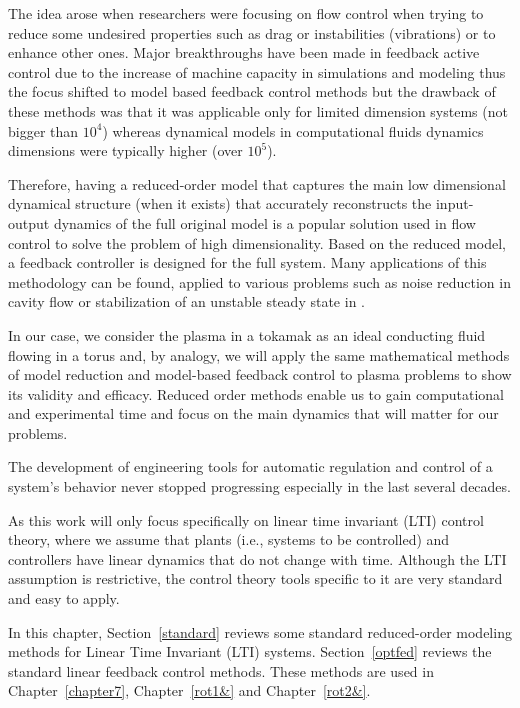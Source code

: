 \documentclass[12pt,lot, lof]{puthesis}
\begin{document}
The idea arose when researchers were focusing on flow control when trying to reduce some undesired properties such as drag or instabilities (vibrations) or to enhance other ones. Major breakthroughs have been made in feedback active control due to the increase of machine capacity in simulations and modeling \cite{ Kim07, Cattafesta08, Choi07, Sipp10} thus the focus shifted to model based feedback control methods but the drawback of these methods was that it was applicable only for limited dimension systems (not bigger than $10^4$) whereas dynamical models in computational fluids dynamics dimensions were typically higher (over $10^5$). 

Therefore, having a reduced-order model that captures the main low dimensional dynamical structure (when it exists) that accurately reconstructs the input-output dynamics of the full original model is a popular solution used in flow control to solve the problem of high dimensionality. Based on the reduced model, a feedback controller is designed for the full system. Many applications of this methodology can be found, applied to various problems such as noise reduction in cavity flow \cite{Rowley05} or stabilization of an unstable steady state in \cite{Ahuja10}.

In our case, we consider the plasma in a tokamak as an ideal conducting fluid flowing in a torus and, by analogy, we will apply the same mathematical methods of model reduction and model-based feedback control to plasma problems to show its validity and efficacy. 
Reduced order methods enable us to gain computational and experimental time and focus on the main dynamics that will matter for our problems. 

The development of engineering tools for automatic regulation and control of a system's behavior never stopped progressing especially in the last several decades.

As this work will only focus specifically on linear time invariant (LTI) control theory, where we assume that plants (i.e., systems to be controlled) and controllers have linear dynamics that do not change with time. Although the LTI assumption is restrictive, the control theory tools specific to it are very standard and easy to apply. 

In this chapter, Section~\ref{standard} reviews some standard reduced-order modeling methods for Linear Time Invariant (LTI) systems. Section~\ref{optfed} reviews the standard linear feedback control methods.
These methods are used in Chapter~\ref{chapter7}, Chapter~\ref{rot1&} and Chapter~\ref{rot2&}. 
\end{document}
